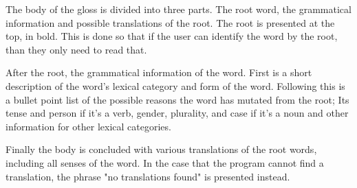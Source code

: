 The body of the gloss is divided into three parts. The root word, the grammatical information and possible translations of the root. The root is presented at the top, in bold. This is done so that if the user can identify the word by the root, than they only need to read that. 

After the root, the grammatical information of the word. First is a short description of the word's lexical category and form of the word. Following this is a bullet point list of the possible reasons the word has mutated from the root; Its tense and person if it's a verb, gender, plurality, and case if it's a noun and other information for other lexical categories. 

Finally the body is concluded with various translations of the root words, including all senses of the word. In the case that the program cannot find a translation, the phrase "no translations found" is presented instead. 
 